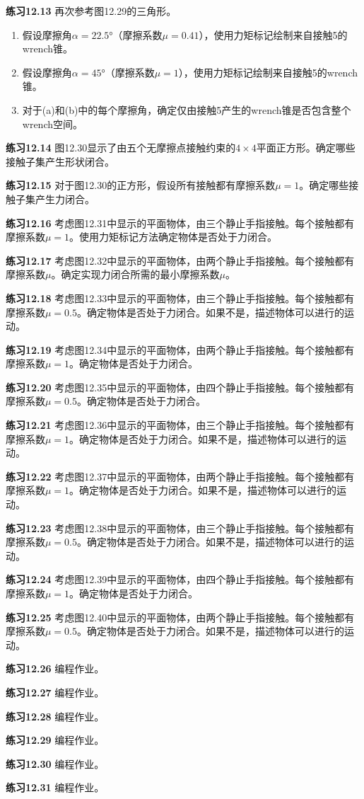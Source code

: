 \documentclass[12pt,a4paper]{article}
\begin{document}
\textbf{练习12.13} 再次参考图12.29的三角形。
\begin{enumerate}
\item[(a)] 假设摩擦角$\alpha = 22.5°$（摩擦系数$\mu = 0.41$），使用力矩标记绘制来自接触5的wrench锥。
\item[(b)] 假设摩擦角$\alpha = 45°$（摩擦系数$\mu = 1$），使用力矩标记绘制来自接触5的wrench锥。
\item[(c)] 对于(a)和(b)中的每个摩擦角，确定仅由接触5产生的wrench锥是否包含整个wrench空间。
\end{enumerate}

\textbf{练习12.14} 图12.30显示了由五个无摩擦点接触约束的$4 \times 4$平面正方形。确定哪些接触子集产生形状闭合。

\textbf{练习12.15} 对于图12.30的正方形，假设所有接触都有摩擦系数$\mu = 1$。确定哪些接触子集产生力闭合。

\textbf{练习12.16} 考虑图12.31中显示的平面物体，由三个静止手指接触。每个接触都有摩擦系数$\mu = 1$。使用力矩标记方法确定物体是否处于力闭合。

\textbf{练习12.17} 考虑图12.32中显示的平面物体，由两个静止手指接触。每个接触都有摩擦系数$\mu$。确定实现力闭合所需的最小摩擦系数$\mu$。

\textbf{练习12.18} 考虑图12.33中显示的平面物体，由三个静止手指接触。每个接触都有摩擦系数$\mu = 0.5$。确定物体是否处于力闭合。如果不是，描述物体可以进行的运动。

\textbf{练习12.19} 考虑图12.34中显示的平面物体，由两个静止手指接触。每个接触都有摩擦系数$\mu = 1$。确定物体是否处于力闭合。

\textbf{练习12.20} 考虑图12.35中显示的平面物体，由四个静止手指接触。每个接触都有摩擦系数$\mu = 0.5$。确定物体是否处于力闭合。

\textbf{练习12.21} 考虑图12.36中显示的平面物体，由三个静止手指接触。每个接触都有摩擦系数$\mu = 1$。确定物体是否处于力闭合。如果不是，描述物体可以进行的运动。

\textbf{练习12.22} 考虑图12.37中显示的平面物体，由两个静止手指接触。每个接触都有摩擦系数$\mu = 1$。确定物体是否处于力闭合。如果不是，描述物体可以进行的运动。

\textbf{练习12.23} 考虑图12.38中显示的平面物体，由三个静止手指接触。每个接触都有摩擦系数$\mu = 0.5$。确定物体是否处于力闭合。如果不是，描述物体可以进行的运动。

\textbf{练习12.24} 考虑图12.39中显示的平面物体，由四个静止手指接触。每个接触都有摩擦系数$\mu = 1$。确定物体是否处于力闭合。

\textbf{练习12.25} 考虑图12.40中显示的平面物体，由两个静止手指接触。每个接触都有摩擦系数$\mu = 0.5$。确定物体是否处于力闭合。如果不是，描述物体可以进行的运动。

\textbf{练习12.26} 编程作业。

\textbf{练习12.27} 编程作业。

\textbf{练习12.28} 编程作业。

\textbf{练习12.29} 编程作业。

\textbf{练习12.30} 编程作业。

\textbf{练习12.31} 编程作业。
\end{document}
